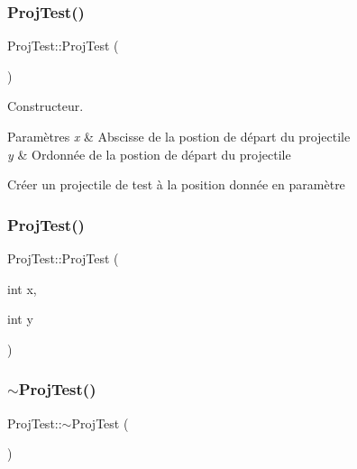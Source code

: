 \subsubsection{\texorpdfstring{Proj\+Test()}{ProjTest()}\hspace{0.1cm}{\footnotesize\ttfamily [1/2]}}
{\footnotesize\ttfamily Proj\+Test\+::\+Proj\+Test (\begin{DoxyParamCaption}{ }\end{DoxyParamCaption})}



Constructeur. 


\begin{DoxyParams}{Paramètres}
{\em x} & Abscisse de la postion de départ du projectile \\
\hline
{\em y} & Ordonnée de la postion de départ du projectile\\
\hline
\end{DoxyParams}
Créer un projectile de test à la position donnée en paramètre \mbox{\label{class_proj_test_ae1611498a5b25d561998068205e9f77f}} 
\subsubsection{\texorpdfstring{Proj\+Test()}{ProjTest()}\hspace{0.1cm}{\footnotesize\ttfamily [2/2]}}
{\footnotesize\ttfamily Proj\+Test\+::\+Proj\+Test (\begin{DoxyParamCaption}\item[{int}]{x,  }\item[{int}]{y }\end{DoxyParamCaption})}

\mbox{\label{class_proj_test_a9bc10c512035ae9f3294179c5d2db808}} 
\subsubsection{\texorpdfstring{$\sim$\+Proj\+Test()}{~ProjTest()}}
{\footnotesize\ttfamily Proj\+Test\+::$\sim$\+Proj\+Test (\begin{DoxyParamCaption}{ }\end{DoxyParamCaption})}



